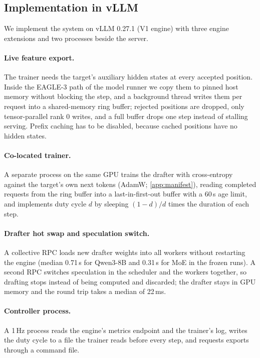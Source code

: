 \documentclass{article}
\begin{document}
\subsection{Implementation in vLLM}\label{sec:impl}

We implement the system on vLLM 0.27.1 (V1 engine) with three engine extensions and two processes beside the server.

\paragraph{Live feature export.} The trainer needs the target's auxiliary hidden states at every accepted position. Inside the EAGLE-3 path of the model runner we copy them to pinned host memory without blocking the step, and a background thread writes them per request into a shared-memory ring buffer; rejected positions are dropped, only tensor-parallel rank 0 writes, and a full buffer drops one step instead of stalling serving. Prefix caching has to be disabled, because cached positions have no hidden states.

\paragraph{Co-located trainer.} A separate process on the same GPU trains the drafter with cross-entropy against the target's own next tokens (AdamW; \cref{app:manifest}), reading completed requests from the ring buffer into a last-in-first-out buffer with a 60\,s age limit, and implements duty cycle $d$ by sleeping $(1-d)/d$ times the duration of each step.

\paragraph{Drafter hot swap and speculation switch.} A collective RPC loads new drafter weights into all workers without restarting the engine (median 0.71\,s for Qwen3-8B and 0.31\,s for MoE in the frozen runs). A second RPC switches speculation in the scheduler and the workers together, so drafting stops instead of being computed and discarded; the drafter stays in GPU memory and the round trip takes a median of 22\,ms.

\paragraph{Controller process.} A 1\,Hz process reads the engine's metrics endpoint and the trainer's log, writes the duty cycle to a file the trainer reads before every step, and requests exports through a command file.
\end{document}
